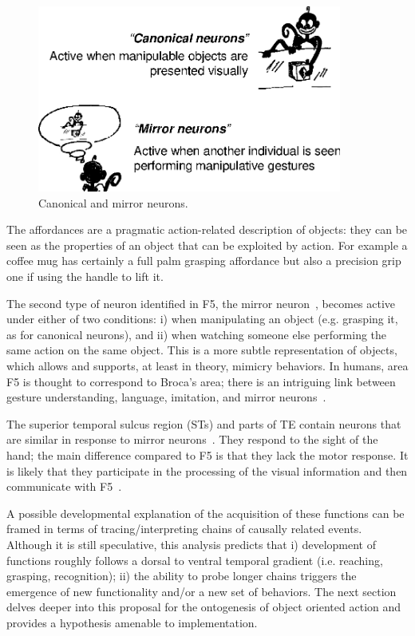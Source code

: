 \ifverbose
\begin{figure}[tbh]
\begin{center}
\includegraphics[width=10cm]{fig-canonical-mirror.eps}
\caption{ 
\label{fig:canonical-mirror}
%
Canonical and mirror neurons.
%
}
\end{center}
\end{figure}
\fi


\ifverbose
%
The affordances are a pragmatic action-related description of objects:
they can be seen as the properties of an object that can be exploited
by action.  For example a coffee mug has certainly a full palm
grasping affordance but also a precision grip one if using the handle
to lift it.
%
\fi

The second type of neuron identified in F5, the mirror neuron~\cite{fadiga00visuomotor}, becomes active under either of two conditions: i)
when manipulating an object (e.g. grasping it, as for canonical neurons), and ii) when watching
someone else performing the same action on the same object. This is a
more subtle representation of objects, which allows and supports, at
least in theory, mimicry behaviors. In humans, area F5 is thought to
correspond to Broca's area; there is an intriguing link between
gesture understanding, language, imitation, and mirror neurons~\cite{rizzolatti98language}.

The superior temporal sulcus region (STs) and parts of TE contain neurons
that are similar in response to mirror neurons~\cite{perret-mistlin-harries-chitty-1990}. 
They respond to the sight of the hand; the main difference compared to F5
is that they lack the motor response. It is likely that they participate in the 
processing of the visual information and then communicate with 
F5~\cite{gallese-fadiga-fogassi-rizzolatti-1996}.

A possible developmental explanation of the acquisition of
these functions can be framed in terms of tracing/interpreting chains 
of causally related events. Although it is still speculative, this analysis 
predicts that i) development of functions roughly follows a dorsal to ventral 
temporal gradient (i.e. reaching, grasping, recognition); ii) the 
ability to probe longer chains triggers the emergence of new functionality 
and/or a new set of behaviors. 
The next section delves deeper into
this proposal for the ontogenesis of object oriented action and
provides a hypothesis amenable to implementation.

